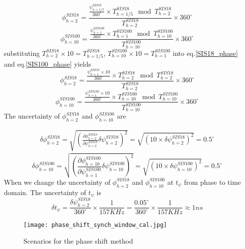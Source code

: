 \begin{equation}
\phi_{h=2}^{SIS18} =  \frac {\frac{\psi_{h=1/5}^{SIS18}}{360^\circ}\times {T_{h=1/5}^{SIS18}} \mod {T_{h=2}^{SIS18}}}{T_{h=2}^{SIS18}}\times {360^\circ} \label{SIS18_phase}
\end{equation}
\begin{equation}
\phi_{h=10}^{SIS100} =  \frac {\frac{\psi_{h=1}^{SIS100}}{360^\circ}\times {T_{h=1}^{SIS100}} \mod {T_{h=10}^{SIS100}}}{T_{h=10}^{SIS100}}\times {360^\circ} \label{SIS100_phase}
\end{equation}
substituting $T_{h=2}^{SIS18}\times 10=T_{h=1/5}^{SIS18}$, $T_{h=10}^{SIS100}\times 10=T_{h=1}^{SIS100}$ into eq.\ref{SIS18_phase} and eq.\ref{SIS100_phase} yields
 \begin{equation}
\phi_{h=2}^{SIS18} =  \frac {\frac{\psi_{h=1}^{SIS18}\times 10}{360^\circ}\times {T_{h=2}^{SIS18}} \mod {T_{h=2}^{SIS18}}}{T_{h=2}^{SIS18}}\times {360^\circ} \label{SIS18_phase}
\end{equation}
\begin{equation}
\phi_{h=10}^{SIS100} =  \frac {\frac{\psi_{h=1}^{SIS100}\times 10}{360^\circ}\times {T_{h=10}^{SIS100}} \mod {T_{h=10}^{SIS100}}}{T_{h=10}^{SIS100}}\times {360^\circ} \label{SIS100_phase}
\end{equation}
The uncertainty of $\phi_{h=2}^{SIS18}$ and $\phi_{h=10}^{SIS100}$ are

\begin{equation}
\begin{aligned}
\delta \phi_{h=2}^{SIS18} = \sqrt {(\frac{\partial \phi_{h=2}^{SIS18}}{\partial \psi_{h=2}^{SIS18}} \delta \psi_{h=2}^{SIS18})^2}=\sqrt {(10 \times \delta \psi_{h=2}^{SIS18})^2}=0.5^\circ
\end{aligned}
\end{equation}
\begin{equation}
\delta \phi_{h=10}^{SIS100} = \sqrt {(\frac{\partial \phi_{h=10}^{SIS100}}{\partial \psi_{h=1}^{SIS100}} \delta \psi_{h=10}^{SIS100})^2}=\sqrt {(10 \times \delta \psi_{h=10}^{SIS100})^2}=0.5^\circ
\end{equation}
When we change the uncertainty of  $\phi_{h=2}^{SIS18}$ and $\phi_{h=10}^{SIS100}$ at $t_\psi$ from phase to time domain. The uncertainty of $t_\psi$ is
\begin{equation} 
\delta t_\psi=\frac {\delta \psi_{h=2}^{SIS18}}{360^\circ} \times \frac{1}{157KHz}=\frac {0.05^\circ}{360^\circ} \times \frac{1}{157KHz}\approx 1ns
\end{equation}
\begin{figure}[!htb]
   \centering   
   \texttt{[image: phase\_shift\_synch\_window\_cal.jpg]}
   \caption{Scenarios for the phase shift method}
   \label{phase_shift}
\end{figure}

